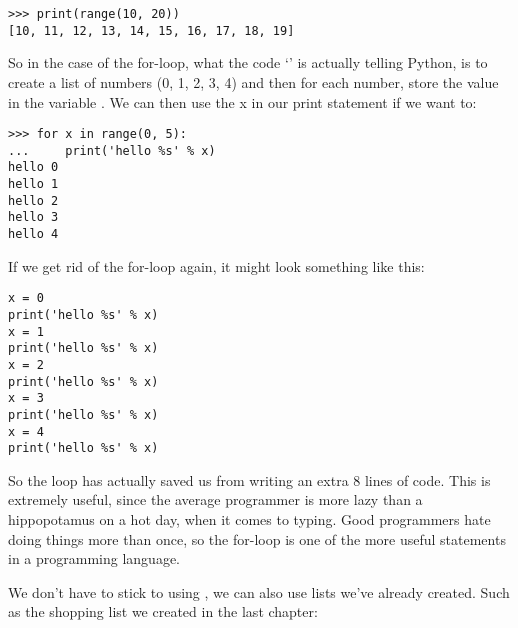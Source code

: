 \begin{listing}
\begin{verbatim}
>>> print(range(10, 20))
[10, 11, 12, 13, 14, 15, 16, 17, 18, 19]
\end{verbatim}
\end{listing}

So in the case of the for-loop, what the code `' is actually telling Python, is to create a list of numbers (0, 1, 2, 3, 4) and then for each number, store the value in the variable . We can then use the x in our print statement if we want to:

\begin{listing}
\begin{verbatim}
>>> for x in range(0, 5):
...     print('hello %s' % x)
hello 0
hello 1
hello 2
hello 3
hello 4
\end{verbatim}
\end{listing}

If we get rid of the for-loop again, it might look something like this:

\begin{listing}
\begin{verbatim}
x = 0
print('hello %s' % x)
x = 1
print('hello %s' % x)
x = 2
print('hello %s' % x)
x = 3
print('hello %s' % x)
x = 4
print('hello %s' % x)
\end{verbatim}
\end{listing}

So the loop has actually saved us from writing an extra 8 lines of code.  This is extremely useful, since the average programmer is more lazy than a hippopotamus on a hot day, when it comes to typing. Good programmers hate doing things more than once, so the for-loop is one of the more useful statements in a programming language.

\linebreak
\par
We don't have to stick to using , we can also use lists we've already created.  Such as the shopping list we created in the last chapter:

